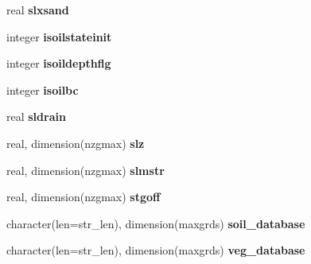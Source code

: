 \begin{DoxyCompactItemize}
\item 
\hypertarget{structename__coms_1_1ename__vars_ac34a8405a0f8069fb33aa33f0a187d06}{
real {\bfseries slxsand}}
\label{structename__coms_1_1ename__vars_ac34a8405a0f8069fb33aa33f0a187d06}

\item 
\hypertarget{structename__coms_1_1ename__vars_a609c3cc8648b91e091d29c69f61e3e8c}{
integer {\bfseries isoilstateinit}}
\label{structename__coms_1_1ename__vars_a609c3cc8648b91e091d29c69f61e3e8c}

\item 
\hypertarget{structename__coms_1_1ename__vars_a15a2756e69c304646aa12c0b02e671a3}{
integer {\bfseries isoildepthflg}}
\label{structename__coms_1_1ename__vars_a15a2756e69c304646aa12c0b02e671a3}

\item 
\hypertarget{structename__coms_1_1ename__vars_affad1c641c88e3f3a7905fd2bde0ea38}{
integer {\bfseries isoilbc}}
\label{structename__coms_1_1ename__vars_affad1c641c88e3f3a7905fd2bde0ea38}

\item 
\hypertarget{structename__coms_1_1ename__vars_ad009cf792cd522fa579bc576db307ddd}{
real {\bfseries sldrain}}
\label{structename__coms_1_1ename__vars_ad009cf792cd522fa579bc576db307ddd}

\item 
\hypertarget{structename__coms_1_1ename__vars_a6115f1d05c7c4cc438b7037cb3a68cfd}{
real, dimension(nzgmax) {\bfseries slz}}
\label{structename__coms_1_1ename__vars_a6115f1d05c7c4cc438b7037cb3a68cfd}

\item 
\hypertarget{structename__coms_1_1ename__vars_aafcab773d7884f235c9cc46275907a92}{
real, dimension(nzgmax) {\bfseries slmstr}}
\label{structename__coms_1_1ename__vars_aafcab773d7884f235c9cc46275907a92}

\item 
\hypertarget{structename__coms_1_1ename__vars_a6b98651227ce361afed4f82c6b3e2b24}{
real, dimension(nzgmax) {\bfseries stgoff}}
\label{structename__coms_1_1ename__vars_a6b98651227ce361afed4f82c6b3e2b24}

\item 
\hypertarget{structename__coms_1_1ename__vars_a5745ac497e5bcd6881160758bfabc47a}{
character(len=str\_\-len), dimension(maxgrds) {\bfseries soil\_\-database}}
\label{structename__coms_1_1ename__vars_a5745ac497e5bcd6881160758bfabc47a}

\item 
\hypertarget{structename__coms_1_1ename__vars_af47e7119f94e7e25e6e2efa1a5473ac4}{
character(len=str\_\-len), dimension(maxgrds) {\bfseries veg\_\-database}}
\label{structename__coms_1_1ename__vars_af47e7119f94e7e25e6e2efa1a5473ac4}


\end{DoxyCompactItemize}
